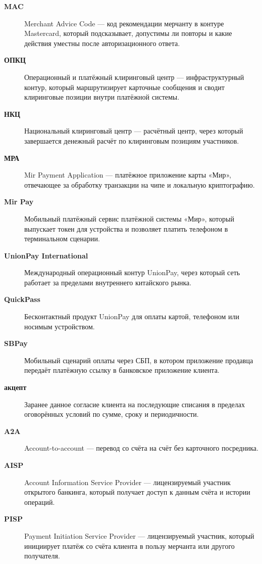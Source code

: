 \begin{description}
  \item[\textbf{MAC}] Merchant Advice Code — код рекомендации мерчанту в контуре Mastercard, который подсказывает, допустимы ли повторы и какие действия уместны после авторизационного ответа.

  \item[\textbf{ОПКЦ}] Операционный и платёжный клиринговый центр — инфраструктурный контур, который маршрутизирует карточные сообщения и сводит клиринговые позиции внутри платёжной системы.

  \item[\textbf{НКЦ}] Национальный клиринговый центр — расчётный центр, через который завершается денежный расчёт по клиринговым позициям участников.

  \item[\textbf{МРА}] Mir Payment Application — платёжное приложение карты «Мир», отвечающее за обработку транзакции на чипе и локальную криптографию.

  \item[\textbf{Mir Pay}] Мобильный платёжный сервис платёжной системы «Мир», который выпускает токен для устройства и позволяет платить телефоном в терминальном сценарии.

  \item[\textbf{UnionPay International}] Международный операционный контур UnionPay, через который сеть работает за пределами внутреннего китайского рынка.

  \item[\textbf{QuickPass}] Бесконтактный продукт UnionPay для оплаты картой, телефоном или носимым устройством.

  \item[\textbf{SBPay}] Мобильный сценарий оплаты через СБП, в котором приложение продавца передаёт платёжную ссылку в банковское приложение клиента.

  \item[\textbf{акцепт}] Заранее данное согласие клиента на последующие списания в пределах оговорённых условий по сумме, сроку и периодичности.

  \item[\textbf{A2A}] Account-to-account — перевод со счёта на счёт без карточного посредника.

  \item[\textbf{AISP}] Account Information Service Provider — лицензируемый участник открытого банкинга, который получает доступ к данным счёта и истории операций.

  \item[\textbf{PISP}] Payment Initiation Service Provider — лицензируемый участник, который инициирует платёж со счёта клиента в пользу мерчанта или другого получателя.


\end{description}

